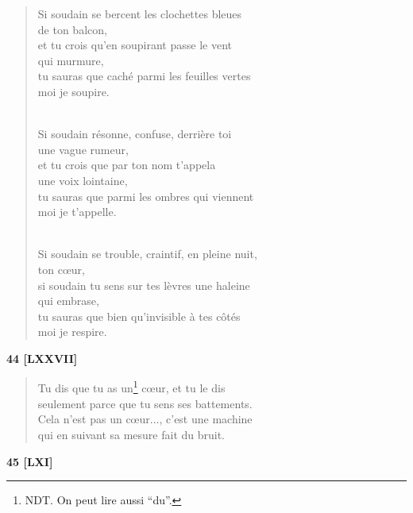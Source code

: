 \documentclass[a4paper,12pt]{book}
\begin{document}
\begin{verse}
Si soudain se bercent les clochettes bleues \\
de ton balcon, \\
et tu crois qu'en soupirant passe le vent \\
qui murmure, \\
tu sauras que caché parmi les feuilles vertes \\
moi je soupire. \\ \

Si soudain résonne, confuse, derrière toi \\
une vague rumeur, \\
et tu crois que par ton nom t'appela \\
une voix lointaine, \\
tu sauras que parmi les ombres qui viennent \\
moi je t'appelle. \\ \

Si soudain se trouble, craintif, en pleine nuit, \\
ton c{\oe}ur, \\
si soudain tu sens sur tes lèvres une haleine \\
qui embrase, \\
tu sauras que bien qu'invisible à tes côtés \\
moi je respire. \\
\end{verse}

\bigskip

\begin{center} {\bf 44 [LXXVII]} \end{center}

\begin{verse}
Tu dis que tu as un\footnote{NDT. On peut lire aussi ``du''.} c{\oe}ur, et tu le dis \\
seulement parce que tu sens ses battements. \\
Cela n'est pas un c{\oe}ur..., c'est une machine \\
qui en suivant sa mesure fait du bruit. \\
\end{verse}

\bigskip

\begin{center} {\bf 45 [LXI]} \end{center}
\end{document}

